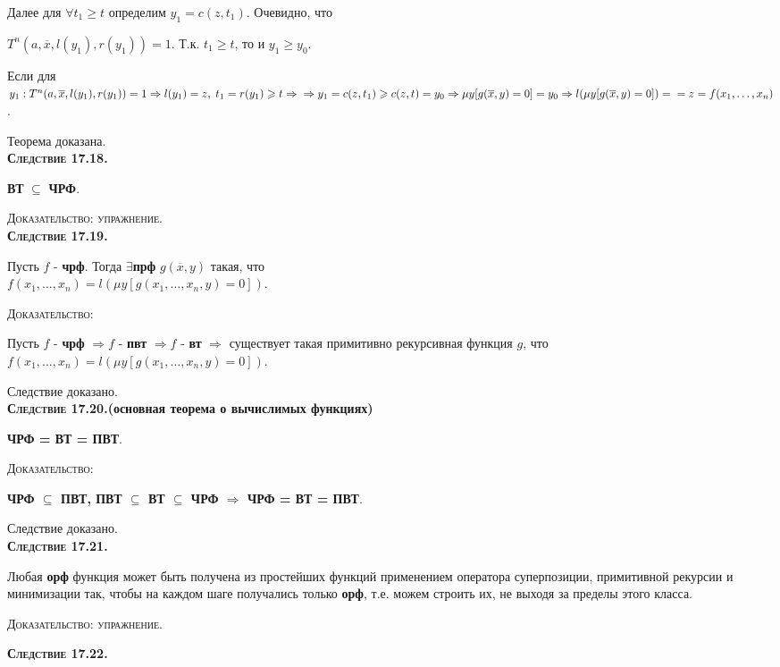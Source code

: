 \documentclass[18pt, a4paper]{extarticle}
\newcommand{\dok}{\textsc{Доказательство:}}
\newcommand{\dokup}{\textsc{Доказательство: упражнение.}}
\begin{document}
Далее для $\forall t_1\geqslant t$ определим $y_1=c(z,t_1)$. Очевидно, что 

$T^n(a,\overline{x},l(y_1),r(y_1))=1$. Т.к. $t_1\geqslant t$, то и $y_1\geqslant y_0$. 

Если для $y_1:T^n(a,\overline{x},l(y_1),r(y_1))=1\Rightarrow l(y_1)=z,\; t_1=r(y_1)\geqslant t\Rightarrow \newline\Rightarrow y_1=c(z,t_1)\geqslant c(z,t)=y_0\Rightarrow \mu y[g(\overline{x},y)=0]=y_0\Rightarrow l(\mu y[g(\overline{x},y)=0])=\newline=z=f(x_1,\dots,x_n)$.

Теорема доказана.\\

\textbf{\textsc{Следствие 17.18.}} 

\textbf{ВТ} $\subseteq$ \textbf{ЧРФ}.

\dokup\\

\textbf{\textsc{Следствие 17.19.}} 

Пусть $f$ -  \textbf{чрф}. Тогда $\exists$\;\textbf{прф} $g(\overline{x},y)$ такая, что\\ $f(x_1,\dots,x_n)=l(\mu y[g(x_1,\dots,x_n,y)=0])$.

\dok

Пусть $f$ -  \textbf{чрф} $\Rightarrow f$ -  \textbf{пвт} $\Rightarrow f$ -  \textbf{вт} $\Rightarrow$ существует такая примитивно рекурсивная функция $g$, что $f(x_1,\dots,x_n)=l(\mu y[g(x_1,\dots,x_n,y)=0])$.

Следствие доказано.\\

\textbf{\textsc{Следствие 17.20.}(основная теорема о вычислимых функциях)} 

\textbf{ЧРФ = ВТ = ПВТ}.

\dok

\textbf{ЧРФ $\subseteq$ ПВТ, ПВТ $\subseteq$ ВТ $\subseteq$ ЧРФ $\Rightarrow$ ЧРФ = ВТ = ПВТ}. 

Следствие доказано.\\

\textbf{\textsc{Следствие 17.21.}} 

Любая \textbf{орф} функция может быть получена из простейших функций применением оператора суперпозиции, примитивной рекурсии и минимизации так, чтобы на каждом шаге получались только \textbf{орф}, т.е. можем строить их, не выходя за пределы этого класса.

\dokup

\textbf{\textsc{Следствие 17.22.}} 
\end{document}
